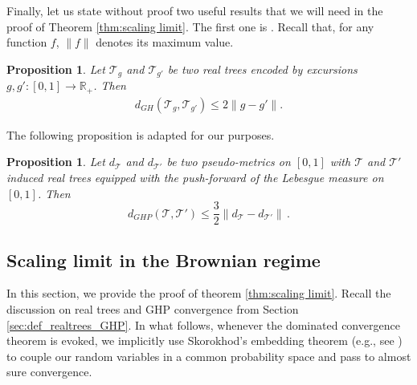 \documentclass{article}
\newcommand{\1}{\mathbbm{1}}								%
\newtheorem{proposition}[theorem]{Proposition}
\theoremstyle{definition}
\numberwithin{equation}{section}
\newcommand{\cT}{\mathcal T}
\newcommand{\R}{\mathbb R}
\begin{document}
Finally, let us state without proof two useful results that we will need in the proof of Theorem \ref{thm:scaling limit}. The first one is \cite[Corollary 3.7]{gall2011scaling}. {Recall that, for any function $f$, $\|f\|$ denotes its maximum value.}


\begin{proposition}\label{prop:gh_fromabove_supnorm}
    Let $\cT_g$ and $\cT_{g'}$ be two real trees encoded by excursions $g,g':[0,1]\to \R_+$. Then
    \begin{align*}
        d_{GH}(\cT_g,\cT_{g'})\leq 2\big\|g-g'\big\|.
    \end{align*}
\end{proposition}

The following proposition is \cite[Proposition 4.14]{duquesne2022scaling} adapted {for our purposes}. 
\begin{proposition} \label{GHP_supnorm}
Let $d_\cT$ and $d_{\cT'}$ be two pseudo-metrics  on $[0,1]$ with $\cT$ and $\cT'$ induced real trees equipped with the push-forward of the Lebesgue measure on $[0,1]$. Then
$$d_{GHP}(\cT,\cT') \leq \frac 3 2 \big\| d_\cT - d_{\cT'} \big\| \, .$$
\end{proposition}


\subsection{Scaling limit in the Brownian regime}

In this section, we provide the proof of theorem \ref{thm:scaling limit}. Recall the discussion on real trees and GHP convergence from Section \ref{sec:def_realtrees_GHP}. In what follows, whenever the dominated convergence theorem is evoked, we implicitly use Skorokhod's embedding theorem (e.g., see \cite{klenke2008probability}) to couple our random variables in a common probability space and pass to almost sure convergence.
\end{document}

